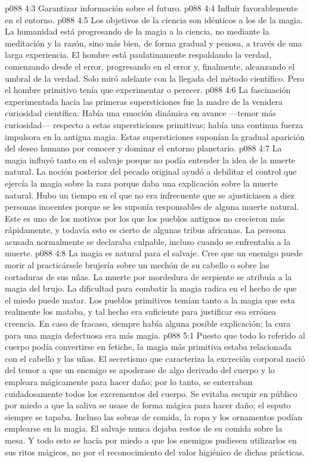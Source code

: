 \vs p088 4:3 Garantizar información sobre el futuro.
\vs p088 4:4 Influir favorablemente en el entorno.
\vs p088 4:5 \pc Los objetivos de la ciencia son idénticos a los de la magia. La humanidad está progresando de la magia a la ciencia, no mediante la meditación y la razón, sino más bien, de forma gradual y penosa, a través de una larga experiencia. El hombre está paulatinamente respaldando la verdad, comenzando desde el error, progresando en el error y, finalmente, alcanzando el umbral de la verdad. Solo miró adelante con la llegada del método científico. Pero el hombre primitivo tenía que experimentar o perecer.
\vs p088 4:6 La fascinación experimentada hacia las primeras supersticiones fue la madre de la venidera curiosidad científica. Había una emoción dinámica en avance ---temor más curiosidad--- respecto a estas supersticiones primitivas; había una continua fuerza impulsora en la antigua magia. Estas supersticiones suponían la gradual aparición del deseo humano por conocer y dominar el entorno planetario.
\vs p088 4:7 La magia influyó tanto en el salvaje porque no podía entender la idea de la muerte natural. La noción posterior del pecado original ayudó a debilitar el control que ejercía la magia sobre la raza porque daba una explicación sobre la muerte natural. Hubo un tiempo en el que no era infrecuente que se ajusticiasen a diez personas inocentes porque se les suponía responsables de alguna muerte natural. Este es uno de los motivos por los que los pueblos antiguos no crecieron más rápidamente, y todavía esto es cierto de algunas tribus africanas. La persona acusada normalmente se declaraba culpable, incluso cuando se enfrentaba a la muerte.
\vs p088 4:8 La magia es natural para el salvaje. Cree que un enemigo puede morir al practicársele brujería sobre un mechón de su cabello o sobre las cortaduras de sus uñas. La muerte por mordedura de serpiente se atribuía a la magia del brujo. La dificultad para combatir la magia radica en el hecho de que el miedo puede matar. Los pueblos primitivos temían tanto a la magia que esta realmente los mataba, y tal hecho era suficiente para justificar esa errónea creencia. En caso de fracaso, siempre había alguna posible explicación; la cura para una magia defectuosa era más magia.
\vs p088 5:1 Puesto que todo lo referido al cuerpo podía convertirse en fetiche, la magia más primitiva estaba relacionada con el cabello y las uñas. El secretismo que caracteriza la excreción corporal nació del temor a que un enemigo se apoderase de algo derivado del cuerpo y lo empleara mágicamente para hacer daño; por lo tanto, se enterraban cuidadosamente todos los excrementos del cuerpo. Se evitaba escupir en público por miedo a que la saliva se usase de forma mágica para hacer daño; el esputo siempre se tapaba. Incluso las sobras de comida, la ropa y los ornamentos podían emplearse en la magia. El salvaje nunca dejaba restos de su comida sobre la mesa. Y todo esto se hacía por miedo a que los enemigos pudiesen utilizarlos en sus ritos mágicos, no por el reconocimiento del valor higiénico de dichas prácticas.
